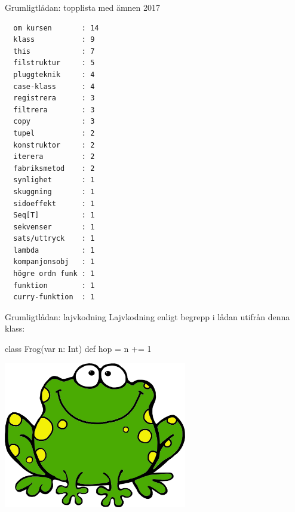 
\ifkompendium\else
{}

\begin{Slide}{Grumligtlådan: topplista med ämnen 2017}
\begin{multicols}{2}
\begin{verbatim}
  om kursen       : 14
  klass           : 9
  this            : 7
  filstruktur     : 5
  pluggteknik     : 4
  case-klass      : 4
  registrera      : 3
  filtrera        : 3
  copy            : 3
  tupel           : 2
  konstruktor     : 2
  iterera         : 2
  fabriksmetod    : 2
  synlighet       : 1
  skuggning       : 1
  sidoeffekt      : 1
  Seq[T]          : 1
  sekvenser       : 1
  sats/uttryck    : 1
  lambda          : 1
  kompanjonsobj   : 1
  högre ordn funk : 1
  funktion        : 1
  curry-funktion  : 1
\end{verbatim}
\end{multicols}
\end{Slide}



\begin{Slide}{Grumligtlådan: lajvkodning}
Lajvkodning enligt begrepp i lådan utifrån denna klass:
\begin{Code}[basicstyle=\ttfamily\SlideFontSize{12}{14}]
class Frog(var n: Int) { def hop = n += 1 }
\end{Code}
\includegraphics[width=0.6\textwidth]{../img/frog}
\end{Slide}

\fi

